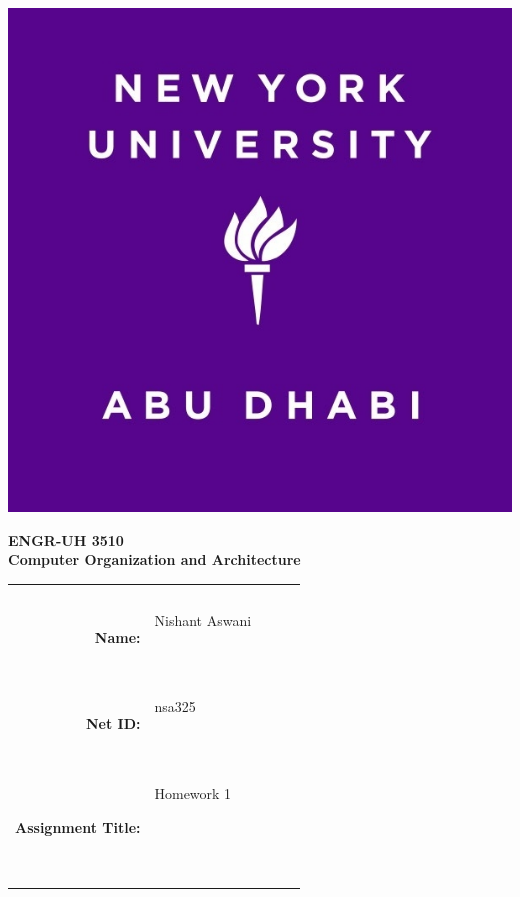 \documentclass{article}
\begin{document}
\pagestyle{fancy}
\fancyhf{}
\renewcommand{\headrulewidth}{0pt}

\begin{center}
  \includegraphics[scale=0.15]{NYUAD-alt-logo.jpg}
\end{center}

{\vspace{1.5em}}

\begin{center}
    \Huge{\textbf{ENGR-UH 3510}}\\
    {\vspace{0.5em}}
    \Huge{\textbf{Computer Organization and Architecture}}
\end{center}

{\vspace{10em}}

\begin{center}
  \begin{tabular}{|rp{5.0cm}lll|}
    \hline
    &  &  &  & \\
    &  &  &  & \\
    \Large{\textbf{Name:}} & \Large{Nishant Aswani}
    
    \  &  &  & \\
    \Large{\textbf{Net ID:}} & \Large{nsa325}
    
    \  &  &  & \\
    \Large{\textbf{Assignment Title:}} & \Large{Homework 1}
    
    \
    
    \  &  &  & \\
    \hline
  \end{tabular}
\end{center}

\

{\newpage}
\end{document}
